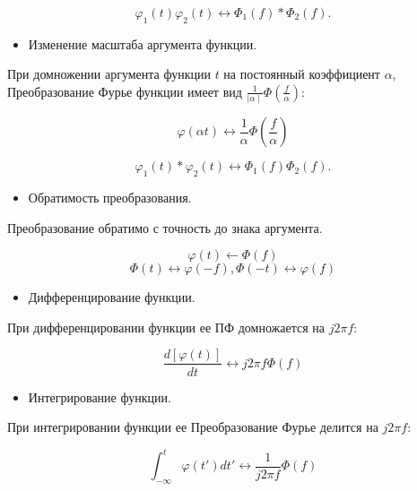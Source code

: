 \documentclass[a4paper,14pt]{extarticle}
\begin{document}
\begin{equation}
\varphi_{1} (t) \varphi_{2} (t) \leftrightarrow \Phi_{1} (f) * \Phi_{2} (f).
\end{equation}

\begin{itemize}
	\item Изменение масштаба аргумента функции.
\end{itemize}
При домножении аргумента функции $t$ на постоянный коэффициент $\alpha$, Преобразование Фурье функции имеет вид $\frac{1}{\mid\alpha\mid} \Phi (\frac{f}{\alpha}):$

\begin{equation}
\varphi(\alpha t) \leftrightarrow \frac{1}{\alpha} \Phi \left(\frac{f}{\alpha} \right)
\end{equation}

\begin{equation}
\varphi_{1} (t) * \varphi_{2} (t) \leftrightarrow \Phi_{1} (f) \Phi_{2} (f).
\end{equation}

\begin{itemize}
	\item Обратимость преобразования.
\end{itemize}
Преобразование обратимо с точность до знака аргумента.

\begin{equation}
\varphi (t) \leftarrow \Phi (f)
\end{equation}
\begin{equation}
\Phi(t) \leftrightarrow \varphi(-f), \Phi (-t) \leftrightarrow \varphi (f)
\end{equation}

\begin{itemize}
	\item Дифференцирование функции.
\end{itemize}
При дифференцировании функции ее ПФ домножается на $j2 \pi f $:

\begin{equation}
\dfrac{d[\varphi (t)]}{dt}\leftrightarrow j2 \pi f \Phi (f)
\end{equation}

\begin{itemize}
	\item Интегрирование функции.
\end{itemize}
При интегрировании функции ее Преобразование Фурье делится на $j2 \pi f :$

\begin{equation}
\int_{-\infty}^{t} \varphi(t') dt' \leftrightarrow \dfrac{1}{j2 \pi f} \Phi (f)
\end{equation}
\end{document}
